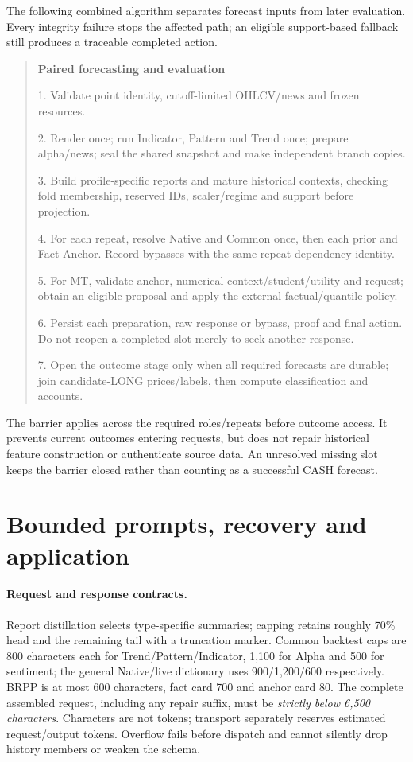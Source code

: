 The following combined algorithm separates forecast inputs from later
evaluation. Every integrity failure stops the affected path; an eligible
support-based fallback still produces a traceable completed action.
\begin{quote}\small{}
\textbf{Paired forecasting and evaluation}\par
1. Validate point identity, cutoff-limited OHLCV/news and frozen resources.\par
2. Render once; run Indicator, Pattern and Trend once; prepare alpha/news;
seal the shared snapshot and make independent branch copies.\par
3. Build profile-specific reports and mature historical contexts, checking
fold membership, reserved IDs, scaler/regime and support before projection.\par
4. For each repeat, resolve Native and Common once, then each prior and
Fact Anchor. Record bypasses with the same-repeat dependency identity.\par
5. For MT, validate anchor, numerical context/student/utility and request;
obtain an eligible proposal and apply the external factual/quantile policy.\par
6. Persist each preparation, raw response or bypass, proof and final action.
Do not reopen a completed slot merely to seek another response.\par
7. Open the outcome stage only when all required forecasts are durable;
join candidate-LONG prices/labels, then compute classification and accounts.
\end{quote}
The barrier applies across the required roles/repeats before outcome
access. It prevents current outcomes entering requests, but does not
repair historical feature construction or authenticate source data.
An unresolved missing slot keeps the barrier closed rather than counting
as a successful CASH forecast.

\section{Bounded prompts, recovery and application}\label{s:052b7113d7072810}
\paragraph{Request and response contracts.}
Report distillation selects type-specific summaries; capping retains
roughly 70\% head and the remaining tail with a truncation marker.
Common backtest caps are 800 characters each for Trend/Pattern/Indicator,
1,100 for Alpha and 500 for sentiment; the general Native/live dictionary
uses 900/1,200/600 respectively. BRPP is at most 600 characters, fact card
700 and anchor card 80. The complete assembled request, including any
repair suffix, must be \emph{strictly below 6,500 characters}. Characters
are not tokens; transport separately reserves estimated request/output
tokens. Overflow fails before dispatch and cannot silently drop history
members or weaken the schema.

